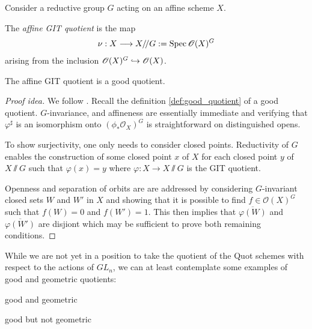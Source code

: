 \documentclass[12pt]{ociamthesis}  %
\begin{document}
Consider a reductive group $G$ acting on an affine scheme $X$.

\begin{definition}
  The \emph{affine GIT quotient} is the map
  \begin{align*}
    \nu : X \longrightarrow X/\!/ G := \operatorname{Spec}\mathscr O(X)^G
  \end{align*}
  arising from the inclusion $\mathscr O(X)^G \hookrightarrow \mathscr O(X)$.
\end{definition}

\begin{theorem}\label{thm:affine_quotient_is_good}
  The affine GIT quotient is a good quotient.
  \begin{proof}[Proof idea]
    We follow \cite[Theorem 4.30]{hoskins2016}. Recall the definition
    \ref{def:good_quotient} of a good quotient. $G$-invariance,
    and affineness are essentially immediate and verifying that
    $\varphi^\sharp$ is an isomorphism onto $(\phi_*\mathscr O_X)^G$
    is straightforward on distinguished opens.

    To show surjectivity, one only needs to consider closed points.
    Reductivity of $G$ enables the construction of some closed point
    $x$ of $X$ for each closed point $y$ of $X\sslash G$ such that
    $\varphi(x) = y$ where $\varphi : X\to X\sslash G$ is the GIT quotient.

    Openness and separation of orbits are are addressed by considering
    $G$-invariant closed sets $W$ and $W'$ in $X$ and showing that
    it is possible to find $f\in\mathscr O(X)^G$ such that
    $f(W) = 0$ and $f(W') = 1$. \cite[Lemma 4.29]{hoskins2016}
    This then implies that $\overline{\varphi(W)}$ and $\overline{\varphi(W')}$
    are disjiont which may be sufficient to prove both remaining conditions.
  \end{proof}
\end{theorem}

While we are not yet in a position to take the quotient of the Quot
schemes with respect to the actions of $GL_n$,
we can at least contemplate some examples of good and geometric
quotients:

\begin{example}
  good and geometric
  \missingexample
\end{example}

\begin{example}
  good but not geometric
  \missingexample
\end{example}
\end{document}
